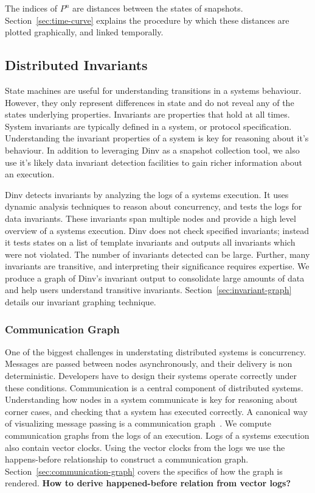 The indices of $P^n$ are distances between the states of snapshots.
Section~\ref{sec:time-curve} explains the procedure by which these distances are
plotted graphically, and linked temporally.

\subsection{Distributed Invariants}

State machines are useful for understanding transitions in a systems behaviour.
However, they only represent differences in state and do not reveal any of the
states underlying properties. Invariants are properties that hold at all times.
System invariants are typically defined in a system, or protocol specification.
Understanding the invariant properties of a system is key for reasoning about
it's behaviour. In addition to leveraging Dinv as a snapshot collection tool,
we also use it's likely data invariant detection facilities to gain richer information
about an execution.

Dinv detects invariants by analyzing the logs of a systems execution. It uses
dynamic analysis techniques to reason about concurrency, and tests the logs for
data invariants. These invariants span multiple nodes and provide a high level
overview of a systems execution. Dinv does not check specified invariants;
instead it tests states on a list of template  invariants and outputs all
invariants which were not violated. The number of invariants detected can be
large. Further, many invariants are transitive, and interpreting their
significance requires expertise. We produce a graph of Dinv's invariant output
to consolidate large amounts of data and help users understand transitive
invariants. Section~\ref{sec:invariant-graph} details our invariant
graphing technique.

\subsubsection{Communication Graph}

One of the biggest challenges in understating distributed systems is
concurrency. Messages are passed between nodes asynchronously, and their delivery
is non deterministic. Developers have to design their systems operate correctly
under these conditions. Communication is a central component of distributed
systems. Understanding how nodes in a system communicate is key for reasoning
about corner cases, and checking that a system has executed correctly. A
canonical way of visualizing message passing is a communication
graph~\cite{Lamport78,BeschastnikhWBE2016}. We compute communication graphs from the logs of
an execution. Logs of a systems execution also contain vector clocks. Using the
vector clocks from the logs we use the happens-before relationship to construct
a communication graph. Section~\ref{sec:communication-graph} covers the specifics
of how the graph is rendered.
\textbf{How to derive happened-before relation from vector logs?}

